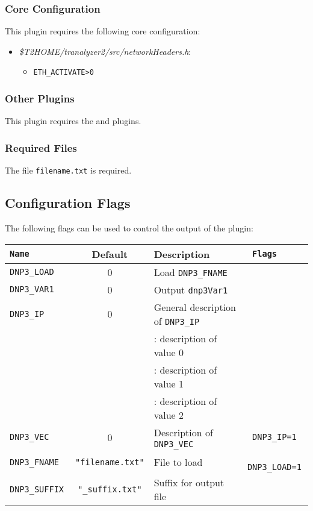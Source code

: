 \documentclass[documentation]{subfiles}
\begin{document}
\subsubsection{Core Configuration}
This plugin requires the following core configuration:
\begin{itemize}
    \item {\em \$T2HOME/tranalyzer2/src/networkHeaders.h}:
        \begin{itemize}
            \item {\tt ETH\_ACTIVATE>0}
        \end{itemize}
\end{itemize}

\subsubsection{Other Plugins}
This plugin requires the  and  plugins.

\subsubsection{Required Files}
The file {\tt filename.txt} is required.

\subsection{Configuration Flags}
The following flags can be used to control the output of the plugin:
\begin{longtable}{>{\tt}lcl>{\tt\small}l}
    \toprule
    {\bf Name} & {\bf Default} & {\bf Description} & {\bf Flags}\\
    \midrule\endhead%
    DNP3\_LOAD   & 0 & Load {\tt DNP3\_FNAME}                       & \\
    DNP3\_VAR1   & 0 & Output {\tt dnp3Var1}                        & \\
    DNP3\_IP     & 0 & General description of {\tt DNP3\_IP}        & \\
                    &   & \qquad 0: description of value 0                & \\
                    &   & \qquad 1: description of value 1                & \\
                    &   & \qquad 2: description of value 2                & \\
    DNP3\_VEC    & 0 & Description of {\tt DNP3\_VEC}               & DNP3\_IP=1  \\ %
    DNP3\_FNAME  & {\tt\small "filename.txt"} & File to load           & DNP3\_LOAD=1\\ %
    DNP3\_SUFFIX & {\tt\small "\_suffix.txt"} & Suffix for output file & \\
    \bottomrule
\end{longtable}
\end{document}
